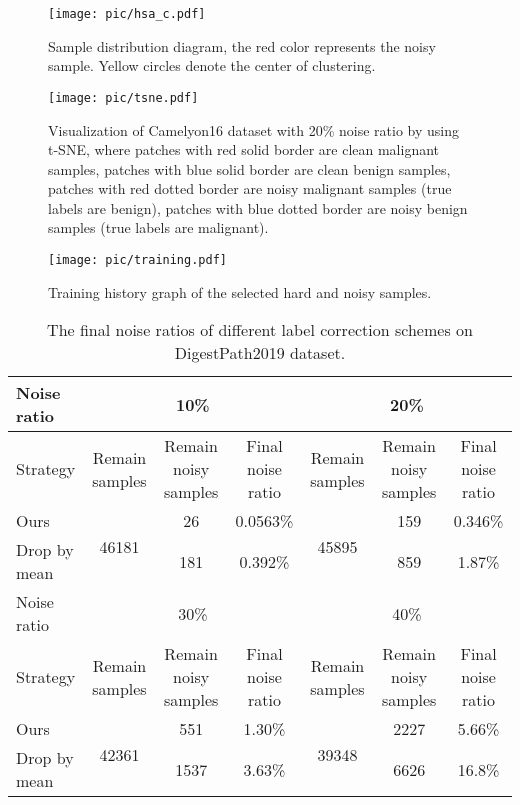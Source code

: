 \begin{figure}[]
  \centering
  \texttt{[image: pic/hsa\_c.pdf]}
\caption{Sample distribution diagram, the red color represents the noisy sample. Yellow circles denote the center of clustering.}
  \label{fig:hsa_c}
\end{figure}

\begin{figure}[]
  \centering
  \texttt{[image: pic/tsne.pdf]}
\caption{Visualization of Camelyon16 dataset with 20\% noise ratio by using t-SNE\cite{laurens2008visiualizing}, where patches with red solid border are clean malignant samples, patches with blue solid border are clean benign samples, patches with red dotted border are noisy malignant samples (true labels are benign), patches with blue dotted border are noisy benign samples (true labels are malignant).}
  \label{fig:tsne}
\end{figure}

\begin{figure}[hbt]
  \centering
  \texttt{[image: pic/training.pdf]}
\caption{Training history graph of the selected hard and noisy samples.}
  \label{fig:hsa_d}
\end{figure}

\begin{table*}[]
\scriptsize
\centering
\caption{{The final noise ratios of different label correction schemes on DigestPath2019 dataset.}}
\label{table:hsa}
\begin{tabular}{@{}lcccccc@{}}
\toprule
Noise ratio  & \multicolumn{3}{c}{10\%}                                          & \multicolumn{3}{c}{20\%}                                          \\ \midrule
Strategy     & Remain samples         & Remain noisy samples & Final noise ratio & Remain samples         & Remain noisy samples & Final noise ratio \\ \midrule
Ours         & \multirow{2}{*}{46181} & 26                   & 0.0563\%          & \multirow{2}{*}{45895} & 159                  & 0.346\%           \\
Drop by mean &                        & 181                  & 0.392\%           &                        & 859                  & 1.87\%            \\ \midrule
Noise ratio  & \multicolumn{3}{c}{30\%}                                          & \multicolumn{3}{c}{40\%}                                          \\ \midrule
Strategy     & Remain samples         & Remain noisy samples & Final noise ratio & Remain samples         & Remain noisy samples & Final noise ratio \\ \midrule
Ours         & \multirow{2}{*}{42361} & 551                  & 1.30\%            & \multirow{2}{*}{39348} & 2227                 & 5.66\%            \\
Drop by mean &                        & 1537                 & 3.63\%            &                        & 6626                 & 16.8\%            \\ \bottomrule
\end{tabular}
\end{table*}

